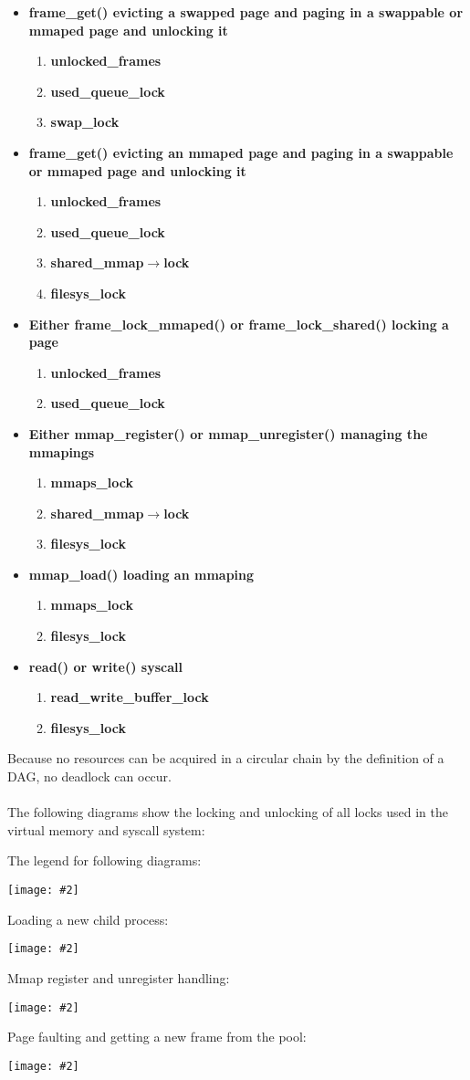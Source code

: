 \documentclass{report}
\newcommand{\bullpara}[2]{\item \textbf{#1} \ #2}
\newcommand{\fun}[1]{\textcolor{Emerald}{\textbf{#1}}}
\newcommand{\var}[1]{\textcolor{RoyalPurple}{\textbf{#1}}}
\newcommand{\centerimage}[2]{\begin{center}
	\texttt{[image: \#2]}
\end{center}}
\newcommand{\compitem}[1]{\begin{itemize}\setlength\itemsep{-0.1em}#1\end{itemize}}
\newcommand{\compenum}[1]{\begin{enumerate}\setlength\itemsep{-0.1em}#1\end{enumerate}}
\begin{document}
				\compitem{
					\bullpara{\fun{frame\_get()} evicting a swapped page and paging in a swappable or mmaped page and unlocking it}{
						\compenum{
							\item \var{unlocked\_frames}
							\item \var{used\_queue\_lock}
							\item \var{swap\_lock}
						}
					}
					\bullpara{\fun{frame\_get()} evicting an mmaped page and paging in a swappable or mmaped page and unlocking it}{
						\compenum{
							\item \var{unlocked\_frames}
							\item \var{used\_queue\_lock}
							\item \var{shared\_mmap$\to$lock}
							\item \var{filesys\_lock}
						}
					}
					\bullpara{Either \fun{frame\_lock\_mmaped()} or \fun{frame\_lock\_shared()} locking a page}{
						\compenum{
							\item \var{unlocked\_frames}
							\item \var{used\_queue\_lock}
						}
					}
					\bullpara{Either \fun{mmap\_register()} or \fun{mmap\_unregister()} managing the mmapings}{
						\compenum{
							\item \var{mmaps\_lock}
							\item \var{shared\_mmap$\to$lock}
							\item \var{filesys\_lock}
						}
					}
					\bullpara{\fun{mmap\_load()} loading an mmaping}{
						\compenum{
							\item \var{mmaps\_lock}
							\item \var{filesys\_lock}
						}
					}
					\bullpara{\fun{read()} or \fun{write()} syscall}{
						\compenum{
							\item \var{read\_write\_buffer\_lock}
							\item \var{filesys\_lock}
						}
					}
				}
				Because no resources can be acquired in a circular chain by the definition of a DAG, no deadlock can occur.
				\\
				\\The following diagrams show the locking and unlocking of all locks used in the virtual memory and syscall system:\\
				\begin{minipage}{\textwidth}
					The legend for following diagrams:
					\centerimage{width=\textwidth}{synch legend.png}
				\end{minipage}
				\begin{minipage}{\textwidth}
					Loading a new child process:
					\centerimage{width=\textwidth}{synch load.png}
				\end{minipage}
				\begin{minipage}{\textwidth}
					Mmap register and unregister handling:
					\centerimage{width=\textwidth}{synch mmap.png}
				\end{minipage}
				\begin{minipage}{\textwidth}
					Page faulting and getting a new frame from the pool:
					\centerimage{width=\textwidth}{synch page fault.png}
				\end{minipage}
\end{document}
